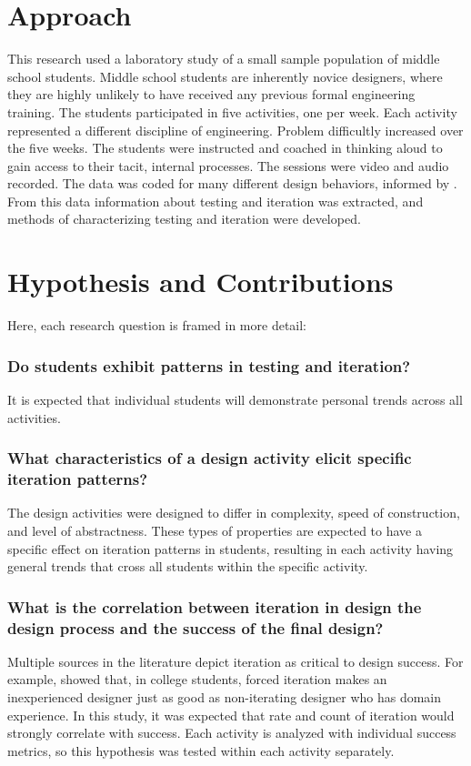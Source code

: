 \section{Approach}
This research used a laboratory study of a small sample population of middle school students. Middle school students are inherently novice designers, where they are highly unlikely to have received any previous formal engineering training. The students participated in five activities, one per week. Each activity represented a different discipline of engineering. Problem difficultly increased over the five weeks. The students were instructed and coached in thinking aloud to gain access to their tacit, internal processes. The sessions were video and audio recorded. The data was coded for many different design behaviors, informed by \citep{welch}. From this data information about testing and iteration was extracted, and methods of characterizing testing and iteration were developed.

\section{Hypothesis and Contributions}
Here, each research question is framed in more detail:
\subsubsection{Do students exhibit patterns in testing and iteration?}
	It is expected that individual students will demonstrate personal trends across all activities. 
	
\subsubsection{What characteristics of a design activity elicit specific iteration patterns?}
	The design activities were designed to differ in complexity, speed of construction, and level of abstractness. These types of properties are expected to have a specific effect on iteration patterns in students, resulting in each activity having general trends that cross all students within the specific activity.
	
\subsubsection{What is the correlation between iteration in design the design process and the success of the final design?}
	Multiple sources in the literature depict iteration as critical to design success. For example, \citet{dow09} showed that, in college students, forced iteration makes an inexperienced designer just as good as non-iterating designer who has domain experience. In this study, it was expected that rate and count of iteration would strongly correlate with success. Each activity is analyzed with individual success metrics, so this hypothesis was tested within each activity separately. 

